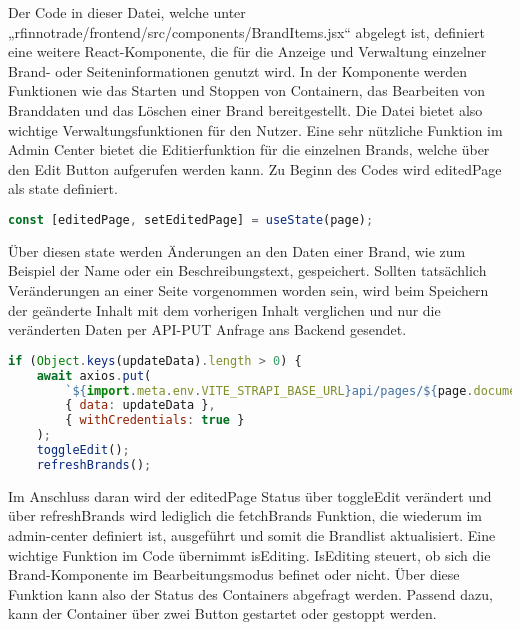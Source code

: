 Der Code in dieser Datei, welche unter „rfinnotrade/frontend/src/components/BrandItems.jsx“ abgelegt ist, definiert eine weitere React-Komponente, die für die Anzeige und Verwaltung einzelner Brand- oder Seiteninformationen genutzt wird.
In der Komponente werden Funktionen wie das Starten und Stoppen von Containern, das Bearbeiten von Branddaten und das Löschen einer Brand bereitgestellt. Die Datei bietet also wichtige Verwaltungsfunktionen für den Nutzer.
Eine sehr nützliche Funktion im Admin Center bietet die Editierfunktion für die einzelnen Brands, welche über den Edit Button aufgerufen werden kann.
Zu Beginn des Codes wird editedPage als state definiert.

\begin{lstlisting}[language=JavaScript, caption={branditem.jsx}, label={lst:branditemjsx}]
const [editedPage, setEditedPage] = useState(page);
\end{lstlisting}

Über diesen state werden Änderungen an den Daten einer Brand, wie zum Beispiel der Name oder ein Beschreibungstext, gespeichert. 
Sollten tatsächlich Veränderungen an einer Seite vorgenommen worden sein, wird beim Speichern der geänderte Inhalt mit dem vorherigen Inhalt verglichen und nur die veränderten Daten per API-PUT Anfrage ans Backend gesendet.

\begin{lstlisting}[language=JavaScript, caption={branditem.jsx Editierung}, label={lst:branditemjsxEditierung}]
if (Object.keys(updateData).length > 0) {
    await axios.put(
        `${import.meta.env.VITE_STRAPI_BASE_URL}api/pages/${page.documentId}`,
        { data: updateData },
        { withCredentials: true }
    );
    toggleEdit();
    refreshBrands();
\end{lstlisting}

Im Anschluss daran wird der editedPage Status über toggleEdit verändert und über refreshBrands wird lediglich die fetchBrands Funktion, die wiederum im admin-center definiert ist, ausgeführt und somit die Brandlist aktualisiert.
Eine wichtige Funktion im Code übernimmt isEditing. IsEditing steuert, ob sich die Brand-Komponente im Bearbeitungsmodus befinet oder nicht. Über diese Funktion kann also der Status des Containers abgefragt werden.
Passend dazu, kann der Container über zwei Button gestartet oder gestoppt werden.

